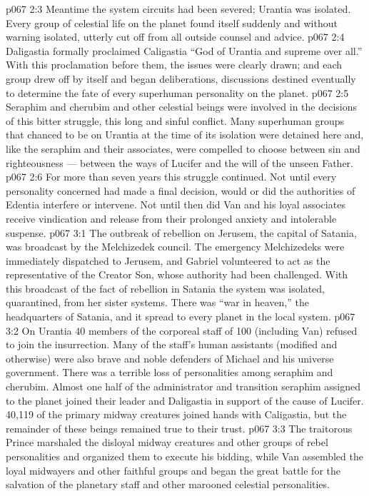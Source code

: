 \vs p067 2:3 \pc Meantime the system circuits had been severed; Urantia was isolated. Every group of celestial life on the planet found itself suddenly and without warning isolated, utterly cut off from all outside counsel and advice.
\vs p067 2:4 \pc Daligastia formally proclaimed Caligastia “God of Urantia and supreme over all.” With this proclamation before them, the issues were clearly drawn; and each group drew off by itself and began deliberations, discussions destined eventually to determine the fate of every superhuman personality on the planet.
\vs p067 2:5 Seraphim and cherubim and other celestial beings were involved in the decisions of this bitter struggle, this long and sinful conflict. Many superhuman groups that chanced to be on Urantia at the time of its isolation were detained here and, like the seraphim and their associates, were compelled to choose between sin and righteousness --- between the ways of Lucifer and the will of the unseen Father.
\vs p067 2:6 For more than seven years this struggle continued. Not until every personality concerned had made a final decision, would or did the authorities of Edentia interfere or intervene. Not until then did Van and his loyal associates receive vindication and release from their prolonged anxiety and intolerable suspense.
\vs p067 3:1 The outbreak of rebellion on Jerusem, the capital of Satania, was broadcast by the Melchizedek council. The emergency Melchizedeks were immediately dispatched to Jerusem, and Gabriel volunteered to act as the representative of the Creator Son, whose authority had been challenged. With this broadcast of the fact of rebellion in Satania the system was isolated, quarantined, from her sister systems. There was “war in heaven,” the headquarters of Satania, and it spread to every planet in the local system.
\vs p067 3:2 On Urantia 40 members of the corporeal staff of 100 (including Van) refused to join the insurrection. Many of the staff’s human assistants (modified and otherwise) were also brave and noble defenders of Michael and his universe government. There was a terrible loss of personalities among seraphim and cherubim. Almost one half of the administrator and transition seraphim assigned to the planet joined their leader and Daligastia in support of the cause of Lucifer. 40,119 of the primary midway creatures joined hands with Caligastia, but the remainder of these beings remained true to their trust.
\vs p067 3:3 The traitorous Prince marshaled the disloyal midway creatures and other groups of rebel personalities and organized them to execute his bidding, while Van assembled the loyal midwayers and other faithful groups and began the great battle for the salvation of the planetary staff and other marooned celestial personalities.
